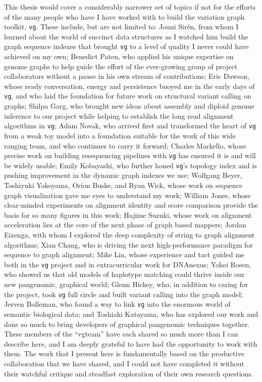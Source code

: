 \begin{acknowledgements}
  This thesis would cover a considerably narrower set of topics if not for the efforts of the many people who have I have worked with to build the variation graph toolkit, {\tt vg}.
  These include, but are not limited to:
  Jouni Sir\'{e}n, from whom I learned about the world of succinct data structures as I watched him build the graph sequence indexes that brought {\tt vg} to a level of quality I never could have achieved on my own;
  Benedict Paten, who applied his unique expertise on genome graphs to help guide the effort of the ever-growing group of project collaborators without a pause in his own stream of contributions;
  Eric Dawson, whose ready conversation, energy and persistence buoyed me in the early days of {\tt vg}, and who laid the foundation for future work on structural variant calling on graphs;
  Shilpa Garg, who brought new ideas about assembly and diploid genome inference to our project while helping to establish the long read alignment algorithms in {\tt vg};
  Adam Novak, who arrived first and transformed the heart of {\tt vg} from a weak toy model into a foundation suitable for the work of this wide ranging team, and who continues to carry it forward;
  Charles Markello, whose precise work on building resequencing pipelines with {\tt vg} has ensured it is and will be widely usable;
  Emily Kobayashi, who further honed {\tt vg}'s topology index and is pushing improvement in the dynamic graph indexes we use;
  Wolfgang Beyer, Toshiyuki Yokoyama, Orion Buske, and Ryan Wick, whose work on sequence graph visualization gave me eyes to understand my work;
  William Jones, whose clear-minded experiments on alignment identity and score comparison provide the basis for so many figures in this work;
  Hajime Suzuki, whose work on alignment acceleration lies at the core of the next phase of graph based mappers;
  Jordan Eizenga, with whom I explored the deep complexity of string to graph alignment algorithms;
  Xian Chang, who is driving the next high-performance paradigm for sequence to graph alignment;
  Mike Lin, whose experience and tact guided me both in the {\tt vg} project and in extracurricular work for DNAnexus;
  Yohei Rosen, who showed us that old models of haplotype matching could thrive inside our new pangenomic, graphical world;
  Glenn Hickey, who, in addition to caring for the project, took {\tt vg} full circle and built variant calling into the graph model;
  Jerven Bolleman, who found a way to link {\tt vg} into the enormous world of semantic biological data;
  and Toshiaki Katayama, who has explored our work and done so much to bring developers of graphical pangenomic techniques together.
  These members of the ``vgteam'' have each shared so much more than I can describe here, and I am deeply grateful to have had the opportunity to work with them.
  The work that I present here is fundamentally based on the productive collaboration that we have shared, and I could not have completed it without their watchful critique and steadfast exploration of their own research questions.


\end{acknowledgements}

